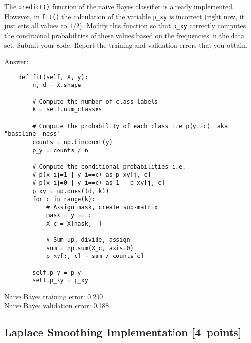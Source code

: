 \documentclass{article}
\newcommand{\blu}[1]{{\textcolor{blu}{#1}}}
\newenvironment{answer}{\par\begingroup\color{gre}Answer: }{\endgroup}
\let\ask\blu
\newcommand\pts[1]{\textcolor{pointscolour}{[#1~points]}}
\begin{document}
    The \texttt{predict()} function of the naive Bayes classifier is already implemented.
    However, in \texttt{fit()}
    the calculation of the variable \texttt{p\_xy} is incorrect
    (right now, it just sets all values to $1/2$).
    \ask{Modify this function so that \texttt{p\_xy} correctly
        computes the conditional probabilities of these values based on the
        frequencies in the data set. Submit your code. Report the training and validation errors that you obtain.}
    \begin{answer}
    \begin{verbatim}
    def fit(self, X, y):
        n, d = X.shape

        # Compute the number of class labels
        k = self.num_classes

        # Compute the probability of each class i.e p(y==c), aka "baseline -ness"
        counts = np.bincount(y)
        p_y = counts / n

        # Compute the conditional probabilities i.e.
        # p(x_ij=1 | y_i==c) as p_xy[j, c]
        # p(x_ij=0 | y_i==c) as 1 - p_xy[j, c]
        p_xy = np.ones((d, k))
        for c in range(k):
            # Assign mask, create sub-matrix
            mask = y == c
            X_c = X[mask, :]

            # Sum up, divide, assign
            sum = np.sum(X_c, axis=0)
            p_xy[:, c] = sum / counts[c]

        self.p_y = p_y
        self.p_xy = p_xy
    \end{verbatim}
    Naive Bayes training error: 0.200 \\
    Naive Bayes validation error: 0.188
    \end{answer}
    \clearpage
    \subsection{Laplace Smoothing Implementation \pts{4}}
\end{document}
